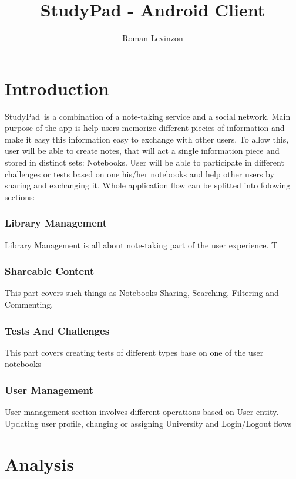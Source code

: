 \documentclass[thesis=B,english]{FITthesis}[2012/10/20]
\title{StudyPad - Android Client}
\author{Roman Levinzon} %
\newcommand{\appname}{StudyPad}
\begin{document}

\chapter{Introduction}

\appname\ is a combination of a note-taking service and a social network. Main purpose of the app is help users memorize different piecies  of information and make it easy this information easy to exchange with other users.
To allow this, user will be able to create notes, that will act a single information piece and stored in distinct sets: Notebooks. User will be able to participate in different challenges or tests based on one his/her notebooks and help other users by sharing and exchanging it. Whole application flow can be splitted into folowing sections:

	\subsection{Library Management}
	Library Management is all about note-taking part of the user experience. T
	
	\subsection{Shareable Content}
	This part covers such things as Notebooks Sharing, Searching, Filtering and Commenting.

	\subsection{Tests And Challenges}
	This part covers creating tests of different types base on one of the user notebooks
	
	\subsection{User Management}
	User management section involves different operations based on User entity. Updating user profile, changing or assigning University and Login/Logout flows

\newpage
\chapter{Analysis}
\end{document}
